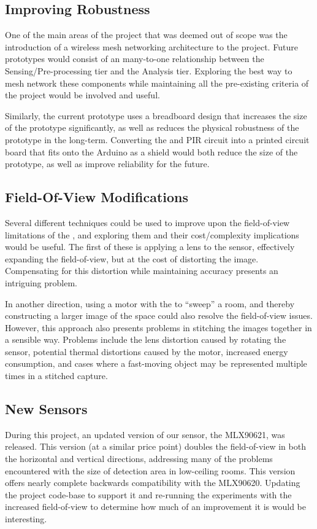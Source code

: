 \documentclass[../thesis/thesis.tex]{subfiles}
\begin{document}
\subsection{Improving Robustness}
One of the main areas of the project that was deemed out of scope was the introduction of a wireless mesh networking architecture to the project. Future prototypes would consist of an many-to-one relationship between the Sensing/Pre-processing tier and the Analysis tier. Exploring the best way to mesh network these components while maintaining all the pre-existing criteria of the project would be involved and useful.

Similarly, the current prototype uses a breadboard design that increases the size of the prototype significantly, as well as reduces the physical robustness of the prototype in the long-term. Converting the \mlx and PIR circuit into a printed circuit board that fits onto the Arduino as a shield would both reduce the size of the prototype, as well as improve reliability for the future.

\subsection{Field-Of-View Modifications}
Several different techniques could be used to improve upon the field-of-view limitations of the \mlx, and exploring them and their cost/complexity implications would be useful. The first of these is applying a lens to the sensor, effectively expanding the field-of-view, but at the cost of distorting the image. Compensating for this distortion while maintaining accuracy presents an intriguing problem.

In another direction, using a motor with the \mlx to ``sweep'' a room, and thereby constructing a larger image of the space could also resolve the field-of-view issues. However, this approach also presents problems in stitching the images together in a sensible way. Problems include the lens distortion caused by rotating the sensor, potential thermal distortions caused by the motor, increased energy consumption, and cases where a fast-moving object may be represented multiple times in a stitched capture. 

\subsection{New Sensors}
During this project, an updated version of our sensor, the MLX90621, was released. This version (at a similar price point) doubles the field-of-view in both the horizontal and vertical directions, addressing many of the problems encountered with the size of detection area in low-ceiling rooms. This version offers nearly complete backwards compatibility with the MLX90620. Updating the project code-base to support it and re-running the experiments with the increased field-of-view to determine how much of an improvement it is would be interesting.
\end{document}
